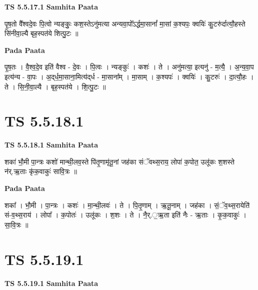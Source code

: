 \documentclass[17pt]{extarticle}
\begin{document}
\textbf{TS 5.5.17.1 } \newline
\textbf{Samhita Paata} \newline

पृ॒ष॒तो वै᳚श्वदे॒वः पि॒त्वो न्यङ्कुः॒ कश॒स्तेऽनु॑मत्या अन्यवा॒पो᳚ऽर्द्धमा॒सानां᳚ मा॒सां क॒श्यपः॒ क्वयिः॑ कु॒टरु॑र्दात्यौ॒हस्ते सि॑नीवा॒ल्यै बृह॒स्पत॑ये शित्पु॒टः ॥ \newline

\textbf{Pada Paata} \newline

पृ॒ष॒तः । वै॒श्व॒दे॒व इति॑ वैश्व - दे॒वः । पि॒त्वः । न्यङ्कुः॑ । कशः॑ । ते । अनु॑मत्या॒ इत्यनु॑ - म॒त्यै॒ । अ॒न्य॒वा॒प इत्य॑न्य - वा॒पः । अ॒द्‌र्ध॒मा॒साना॒मित्य॑द्‌र्ध - मा॒साना᳚म् । मा॒साम् । क॒श्यपः॑ । क्वयिः॑ । कु॒टरुः॑ । दा॒त्यौ॒हः । ते । सि॒नी॒वा॒ल्यै । बृह॒स्पत॑ये । शि॒त्पु॒टः ॥  \newline





\section{ TS 5.5.18.1 }

\textbf{TS 5.5.18.1 } \newline
\textbf{Samhita Paata} \newline

शका॑ भौ॒मी पा॒न्त्रः कशो॑ मान्थी॒लव॒स्ते पि॑तृ॒णामृ॑तू॒नां जह॑का संॅवथ्स॒राय॒ लोपा॑ क॒पोत॒ उलू॑कः श॒शस्ते न॑र्.ऋ॒ताः कृ॑क॒वाकुः॑ सावि॒त्रः ॥ \newline

\textbf{Pada Paata} \newline

शका᳚ । भौ॒मी । पा॒न्त्रः । कशः॑ । मा॒न्थी॒लवः॑ । ते । पि॒तृ॒णाम् । ऋ॒तू॒नाम् । जह॑का । सं॒ॅव॒थ्स॒रायेति॑ सं-व॒थ्स॒राय॑ । लोपा᳚ । क॒पोतः॑ । उलू॑कः । श॒शः । ते । नै॒र्.॒ऋ॒ता इति॑ नैः - ऋ॒ताः । कृ॒क॒वाकुः॑ । सा॒वि॒त्रः ॥  \newline





\section{ TS 5.5.19.1 }

\textbf{TS 5.5.19.1 } \newline
\textbf{Samhita Paata} \newline
\end{document}
